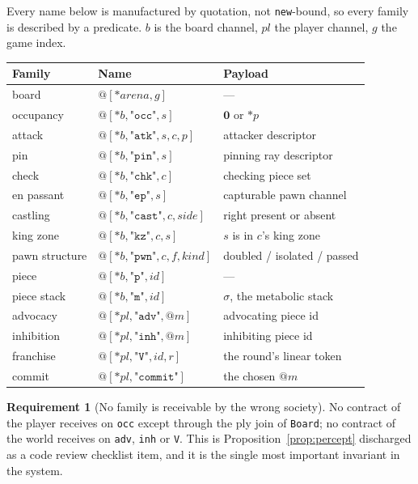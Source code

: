 \documentclass[11pt,a4paper]{article}
\makeatletter
\theoremstyle{plain}
\theoremstyle{definition}
\newtheorem{requirement}[theorem]{Requirement}
\theoremstyle{remark}
\newcommand{\Nil}{\mathbf{0}}
\newcommand{\qt}[1]{\ensuremath{@#1}}
\makeatother
\begin{document}
Every name below is manufactured by quotation, not \texttt{new}-bound, so every
family is described by a predicate. $b$ is the board channel, $\mathit{pl}$ the
player channel, $g$ the game index.

\begin{center}
\begin{tabular}{@{}lll@{}}
\toprule
Family & Name & Payload \\
\midrule
board          & $\qt{[*\mathit{arena},g]}$                       & --- \\
occupancy      & $\qt{[*b,\texttt{"occ"},s]}$                     & $\Nil$ or $*p$ \\
attack         & $\qt{[*b,\texttt{"atk"},s,c,p]}$                 & attacker descriptor \\
pin            & $\qt{[*b,\texttt{"pin"},s]}$                     & pinning ray descriptor \\
check          & $\qt{[*b,\texttt{"chk"},c]}$                     & checking piece set \\
en passant     & $\qt{[*b,\texttt{"ep"},s]}$                      & capturable pawn channel \\
castling       & $\qt{[*b,\texttt{"cast"},c,\mathit{side}]}$      & right present or absent \\
king zone      & $\qt{[*b,\texttt{"kz"},c,s]}$                   & $s$ is in $c$'s king zone \\
pawn structure & $\qt{[*b,\texttt{"pwn"},c,f,\mathit{kind}]}$    & doubled / isolated / passed \\
piece          & $\qt{[*b,\texttt{"p"},\mathit{id}]}$             & --- \\
piece stack    & $\qt{[*b,\texttt{"m"},\mathit{id}]}$             & $\sigma$, the metabolic stack \\
advocacy       & $\qt{[*\mathit{pl},\texttt{"adv"},\qt{m}]}$      & advocating piece id \\
inhibition     & $\qt{[*\mathit{pl},\texttt{"inh"},\qt{m}]}$      & inhibiting piece id \\
franchise      & $\qt{[*\mathit{pl},\texttt{"V"},\mathit{id},r]}$ & the round's linear token \\
commit         & $\qt{[*\mathit{pl},\texttt{"commit"}]}$          & the chosen $\qt{m}$ \\
\bottomrule
\end{tabular}
\end{center}

\begin{requirement}[No family is receivable by the wrong society]
\label{req:sep}
No contract of the player receives on \texttt{occ} except through the ply join
of \texttt{Board}; no contract of the world receives on \texttt{adv},
\texttt{inh} or \texttt{V}. This is Proposition~\ref{prop:percept} discharged as
a code review checklist item, and it is the single most important invariant in
the system.
\end{requirement}
\end{document}
